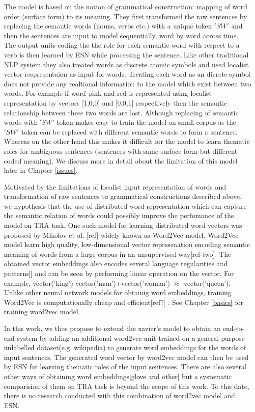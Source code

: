 The model is based on the notion of grammatical construction: mapping of word order (surface form) to its meaning. They first transformed the raw sentences by replacing the semantic words (nouns, verbs etc.) with a unique token $'SW'$ and then the sentences are input to model sequentially, word by word across time. The output units coding the the role for each semantic word with respect to a verb is then learned by ESN while processing the sentence. Like other traditional NLP system they also treated words as discrete atomic symbols and used localist vector respresentaion as input for words. Treating each word as an dicrete symbol does not provide any realtional information to the model which exist between two words. For example if word pink and red is  represented using localist representation by vectors [1,0,0] and [0,0,1] respectively then the semantic relationship between these two words are lost. Although replacing of semantic words with $'SW'$ token makes easy to train the model on small corpus as the $'SW'$ token can be replaced with different semantic words to form a sentence. Whereas on the other hand this makes it difficult for the model to learn thematic roles for ambiguous sentences (sentences with same surface form but different coded meaning). We discuss more in detail about the limitation of this model later in Chapter \ref{issues}.

Motivated by the limitations of localist input representation of words and transformation of raw sentences to grammatical constructions described above, we hypothesis that the use of distributed word representation which can capture the semantic relation of words could possibly improve the perfomance of the model on TRA task. One such model for learning distributed word vectors was proposed by Mikolov et al. [ref] widely known as Word2Vec model. Word2Vec model learn high quality, low-dimensional vector represenation encoding semantic meaning of words from a large corpus in an unsupervised way[ref-two]. The obtained vector embeddings also encodes several language regularities and patterns[] and can be seen by performing linear operation on the vector. For example, vector('king')-vector('man')+vector('woman') $\approx$ vector('queen').  Unlike other neural network models for obtainig word embeddings, training Word2Vec is computationally cheap and efficient[ref?] . See Chapter \ref{basics} for training word2vec model. 

In this work, we thus propose to extend the xavier's model to obtain an end-to-end system by adding an additional word2vec unit trained on a general purpose unlabelled dataset(e.g. wikipedia) to generate word embeddings for the words of input sentences. The generated word vector by word2vec model can then be used by ESN for learning thematic roles of the input sentences. There are also several other ways of obtaining word embeddings[glove and other] but a systematic comparision of them on TRA task is beyond the scope of this work. To this date, there is no research conducted with this combination of word2vec model and ESN.


